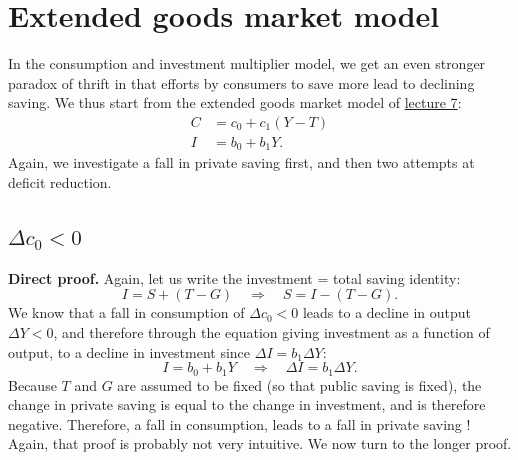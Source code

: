 \documentclass[]{book}
\theoremstyle{definition}
\theoremstyle{definition}
\theoremstyle{definition}
\theoremstyle{remark}
\begin{document}
\hypertarget{extended}{\section{Extended goods market
model}\label{extended}}

In the consumption and investment multiplier model, we get an even
stronger paradox of thrift in that efforts by consumers to save more
lead to declining saving. We thus start from the extended goods market
model of \protect\hyperlink{cons-function}{lecture 7}: \[
\begin{aligned}
C   &=c_{0}+c_{1}\left(Y-T\right)\\
I   &=b_{0}+b_{1}Y.
\end{aligned}
\] Again, we investigate a fall in private saving first, and then two
attempts at deficit reduction.

\subsection{\texorpdfstring{\(\Delta c_{0}<0\)}{\textbackslash{}Delta c\_\{0\}\textless{}0}}\label{delta-c_00-1}

\textbf{Direct proof.} Again, let us write the investment = total saving
identity:
\[I=S+\left(T-G\right)\quad\Rightarrow\quad S=I-\left(T-G\right).\] We
know that a fall in consumption of \(\Delta c_{0}<0\) leads to a decline
in output \(\Delta Y<0\), and therefore through the equation giving
investment as a function of output, to a decline in investment since
\(\Delta I=b_{1}\Delta Y\):
\[I=b_{0}+b_{1}Y\quad\Rightarrow\quad\Delta I=b_{1}\Delta Y.\] Because
\(T\) and \(G\) are assumed to be fixed (so that public saving is
fixed), the change in private saving is equal to the change in
investment, and is therefore negative. Therefore, a fall in consumption,
leads to a fall in private saving ! Again, that proof is probably not
very intuitive. We now turn to the longer proof.
\end{document}
